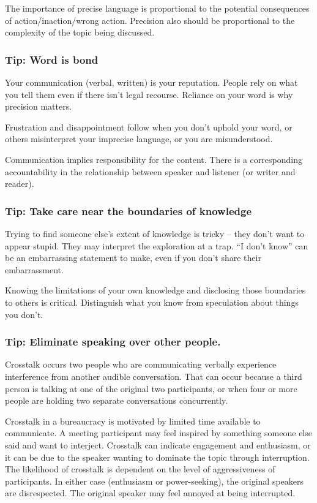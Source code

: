 The importance of precise language is proportional to the potential consequences of action/inaction/wrong action.
Precision also should be proportional to the complexity of the topic being discussed. 

\subsubsection{Tip: Word is bond\label{sec:word-is-bond}}

Your communication (verbal, written) is your reputation. People rely on what you tell them even if there isn't legal recourse. Reliance on your word is why precision matters. 

Frustration and disappointment follow when you don't uphold your word, or others misinterpret your imprecise language, or you are misunderstood.

Communication implies responsibility for the content.  There is a corresponding accountability in the relationship between speaker and listener (or writer and reader).

\subsubsection{Tip: Take care near the boundaries of knowledge}

Trying to find someone else's extent of knowledge is tricky -- they don't want to appear stupid. They may interpret the exploration at a trap. ``I don't know'' can be an embarrassing statement to make, even if you don't share their embarrassment. 

Knowing the limitations of your own knowledge and disclosing those boundaries to others is critical. Distinguish what you know from speculation about things you don't. 



\subsubsection{Tip: Eliminate speaking over other people.\label{sec:crosstalk}}

Crosstalk occurs two people who are communicating verbally experience interference from another audible conversation. That can occur because a third person is talking at one of the original two participants, or when four or more people are holding two separate conversations concurrently. 

Crosstalk in a bureaucracy is motivated by
limited time available to communicate. A meeting participant may feel inspired by something someone else said and want to interject. 
Crosstalk can indicate engagement and enthusiasm, or it can be due to the speaker wanting to dominate the topic through interruption. The likelihood of crosstalk is dependent on the level of aggressiveness of participants.
In either case (enthusiasm or power-seeking), the original speakers are disrespected. The original speaker may feel annoyed at being interrupted.




